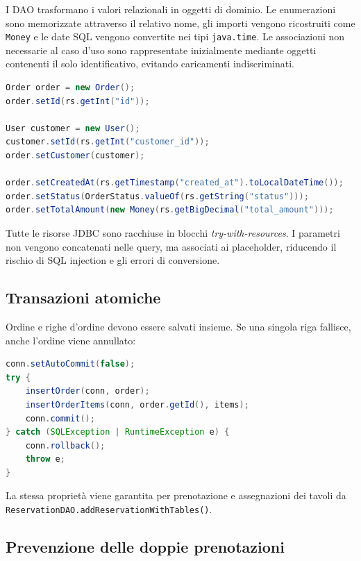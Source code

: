 \documentclass[12pt,a4paper]{article}
\newcommand{\code}[1]{\nolinkurl{#1}}
\begin{document}
I DAO trasformano i valori relazionali in oggetti di dominio. Le enumerazioni
sono memorizzate attraverso il relativo nome, gli importi vengono ricostruiti
come \code{Money} e le date SQL vengono convertite nei tipi
\code{java.time}. Le associazioni non necessarie al caso d'uso sono
rappresentate inizialmente mediante oggetti contenenti il solo identificativo,
evitando caricamenti indiscriminati.

\begin{lstlisting}[style=codeStyle,language=Java,
caption={Esempio di mapping di una riga della tabella orders.}]
Order order = new Order();
order.setId(rs.getInt("id"));

User customer = new User();
customer.setId(rs.getInt("customer_id"));
order.setCustomer(customer);

order.setCreatedAt(rs.getTimestamp("created_at").toLocalDateTime());
order.setStatus(OrderStatus.valueOf(rs.getString("status")));
order.setTotalAmount(new Money(rs.getBigDecimal("total_amount")));
\end{lstlisting}

Tutte le risorse JDBC sono racchiuse in blocchi
\emph{try-with-resources}. I parametri non vengono concatenati nelle query, ma
associati ai placeholder, riducendo il rischio di SQL injection e gli errori di
conversione.

\subsection{Transazioni atomiche}

Ordine e righe d'ordine devono essere salvati insieme. Se una singola riga
fallisce, anche l'ordine viene annullato:

\begin{lstlisting}[style=codeStyle,language=Java,
caption={Transazione per ordine e righe.}]
conn.setAutoCommit(false);
try {
    insertOrder(conn, order);
    insertOrderItems(conn, order.getId(), items);
    conn.commit();
} catch (SQLException | RuntimeException e) {
    conn.rollback();
    throw e;
}
\end{lstlisting}

La stessa proprietà viene garantita per prenotazione e assegnazioni dei tavoli
da \code{ReservationDAO.addReservationWithTables()}.

\subsection{Prevenzione delle doppie prenotazioni}
\end{document}
